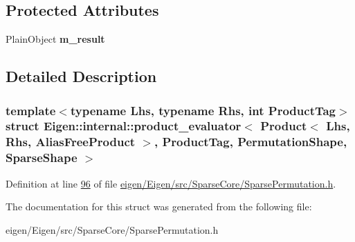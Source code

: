 \subsection*{Protected Attributes}
\begin{DoxyCompactItemize}
\item 
\mbox{\label{struct_eigen_1_1internal_1_1product__evaluator_3_01_product_3_01_lhs_00_01_rhs_00_01_alias_free_0706ef7a5a2e7de13f2e1755913a650d_af1f20735e079bed247a3fbd74225a5bd}} 
Plain\+Object {\bfseries m\+\_\+result}
\end{DoxyCompactItemize}


\subsection{Detailed Description}
\subsubsection*{template$<$typename Lhs, typename Rhs, int Product\+Tag$>$\newline
struct Eigen\+::internal\+::product\+\_\+evaluator$<$ Product$<$ Lhs, Rhs, Alias\+Free\+Product $>$, Product\+Tag, Permutation\+Shape, Sparse\+Shape $>$}



Definition at line \hyperlink{eigen_2_eigen_2src_2_sparse_core_2_sparse_permutation_8h_source_l00096}{96} of file \hyperlink{eigen_2_eigen_2src_2_sparse_core_2_sparse_permutation_8h_source}{eigen/\+Eigen/src/\+Sparse\+Core/\+Sparse\+Permutation.\+h}.



The documentation for this struct was generated from the following file\+:\begin{DoxyCompactItemize}
\item 
eigen/\+Eigen/src/\+Sparse\+Core/\+Sparse\+Permutation.\+h\end{DoxyCompactItemize}
